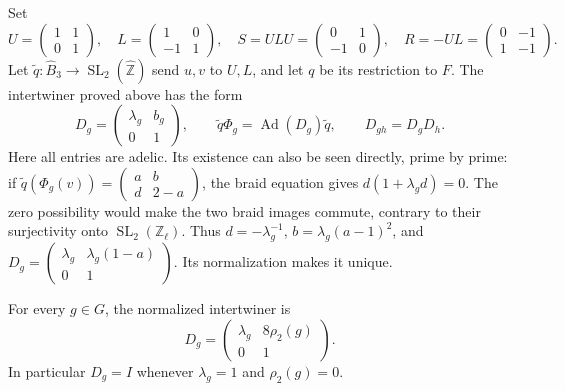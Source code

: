 Set
\[
 U=\begin{pmatrix}1&1\\0&1\end{pmatrix},\quad
 L=\begin{pmatrix}1&0\\-1&1\end{pmatrix},\quad
 S=ULU=\begin{pmatrix}0&1\\-1&0\end{pmatrix},\quad
 R=-UL=\begin{pmatrix}0&-1\\1&-1\end{pmatrix}.
\]
Let $\widetilde q:\widehat B_3\to
\operatorname{SL}_2(\widehat{\mathbb Z})$ send $u,v$ to $U,L$,
and let $q$ be its restriction to $F$.  The intertwiner proved above
has the form
\begin{equation}
 D_g=\begin{pmatrix}\lambda_g&b_g\\0&1\end{pmatrix},\qquad
 \widetilde q\Phi_g=\operatorname{Ad}(D_g)\widetilde q,\qquad
 D_{gh}=D_gD_h.
 \label{eq:adelic-frame-intertwiner}
\end{equation}
Here all entries are adelic.  Its existence can also be seen directly,
prime by prime: if
$\widetilde q(\Phi_g(v))=\left(\begin{smallmatrix}
 a&b\\d&2-a\end{smallmatrix}\right)$, the braid equation gives
$d(1+\lambda_gd)=0$.  The zero possibility would make the two
braid images commute, contrary to their surjectivity onto
$\operatorname{SL}_2(\mathbb Z_\ell)$.  Thus
$d=-\lambda_g^{-1}$, $b=\lambda_g(a-1)^2$, and
$D_g=\left(\begin{smallmatrix}\lambda_g&\lambda_g(1-a)\\0&1
\end{smallmatrix}\right)$.  Its normalization makes it unique.

\begin{lemma}\label{lem:adelic-explicit-intertwiner}
For every \(g\in G\), the normalized intertwiner is
\[
 D_g=\begin{pmatrix}\lambda_g&8\rho_2(g)\\0&1\end{pmatrix}.
\]
In particular \(D_g=I\) whenever \(\lambda_g=1\) and
\(\rho_2(g)=0\).
\end{lemma}

